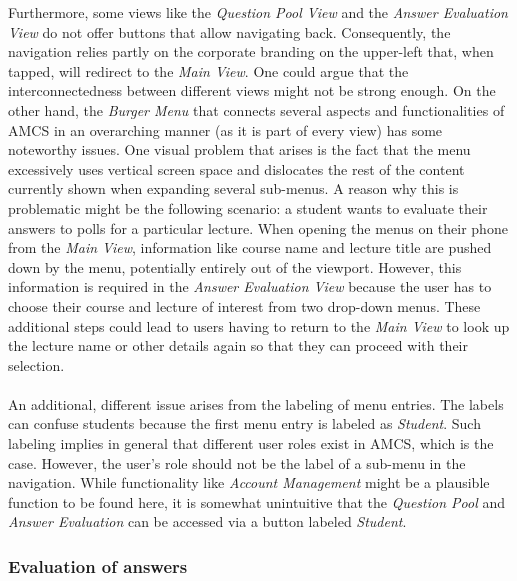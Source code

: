 Furthermore, some views like the \emph{Question Pool View} and the \emph{Answer Evaluation View} do not offer buttons that allow navigating back. Consequently, the navigation relies partly on the corporate branding on the upper-left that, when tapped, will redirect to the \emph{Main View}.
One could argue that the interconnectedness between different views might not be strong enough.
\newline
\newline
On the other hand, the \emph{Burger Menu} that connects several aspects and functionalities of AMCS in an overarching manner (as it is part of every view) has some noteworthy issues. 
One visual problem that arises is the fact that the menu excessively uses vertical screen space and dislocates the rest of the content currently shown when expanding several sub-menus. A reason why this is problematic might be the following scenario: a student wants to evaluate their answers to polls for a particular lecture. When opening the menus on their phone from the \emph{Main View}, information like course name and lecture title are pushed down by the menu, potentially entirely out of the viewport. However, this information is required in the \emph{Answer Evaluation View} because the user has to choose their course and lecture of interest from two drop-down menus. These additional steps could lead to users having to return to the \emph{Main View} to look up the lecture name or other details again so that they can proceed with their selection.
\\
\\
An additional, different issue arises from the labeling of menu entries. The labels can confuse students because the first menu entry is labeled as \emph{Student}. Such labeling implies in general that different user roles exist in AMCS, which is the case. However, the user's role should not be the label of a sub-menu in the navigation. While functionality like \emph{Account Management} might be a plausible function to be found here, it is somewhat unintuitive that the \emph{Question Pool} and \emph{Answer Evaluation} can be accessed via a button labeled \emph{Student}.

\subsubsection{Evaluation of answers}

